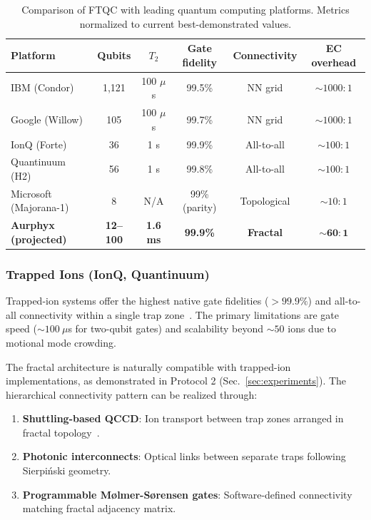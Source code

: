 \begin{table}[h]
\caption{Comparison of FTQC with leading quantum computing platforms. Metrics normalized to current best-demonstrated values.}
\label{tab:platform_comparison}
\begin{ruledtabular}
\begin{tabular}{lccccc}
\textbf{Platform} & \textbf{Qubits} & \textbf{$T_2$} & \textbf{Gate fidelity} & \textbf{Connectivity} & \textbf{EC overhead} \\
\hline
IBM (Condor) & 1,121 & 100 $\mu$s & 99.5\% & NN grid & $\sim 1000:1$ \\
Google (Willow) & 105 & 100 $\mu$s & 99.7\% & NN grid & $\sim 1000:1$ \\
IonQ (Forte) & 36 & 1 s & 99.9\% & All-to-all & $\sim 100:1$ \\
Quantinuum (H2) & 56 & 1 s & 99.8\% & All-to-all & $\sim 100:1$ \\
Microsoft (Majorana-1) & 8 & N/A & 99\% (parity) & Topological & $\sim 10:1$ \\
\textbf{Aurphyx (projected)} & \textbf{12--100} & \textbf{1.6 ms} & \textbf{99.9\%} & \textbf{Fractal} & $\mathbf{\sim 60:1}$ \\
\end{tabular}
\end{ruledtabular}
\end{table}

\subsubsection{Trapped Ions (IonQ, Quantinuum)}

Trapped-ion systems offer the highest native gate fidelities ($> 99.9\%$) and all-to-all connectivity within a single trap zone~\cite{Bruzewicz2019}. The primary limitations are gate speed ($\sim 100~\mu$s for two-qubit gates) and scalability beyond $\sim 50$ ions due to motional mode crowding.

The fractal architecture is naturally compatible with trapped-ion implementations, as demonstrated in Protocol 2 (Sec.~\ref{sec:experiments}). The hierarchical connectivity pattern can be realized through:
\begin{enumerate}
\item \textbf{Shuttling-based QCCD}: Ion transport between trap zones arranged in fractal topology~\cite{Pino2021}.
\item \textbf{Photonic interconnects}: Optical links between separate traps following Sierpi\'{n}ski geometry.
\item \textbf{Programmable M{\o}lmer-S{\o}rensen gates}: Software-defined connectivity matching fractal adjacency matrix.
\end{enumerate}

